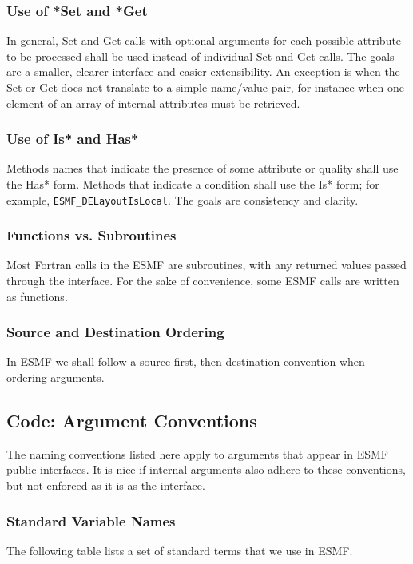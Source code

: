 \subsubsection{Use of *Set and *Get} In general, Set and Get calls with optional arguments
for each possible attribute to be processed shall be used instead of individual
Set and Get calls.  The goals are a smaller, clearer interface and easier extensibility.
An exception is when the Set or Get does not translate to a simple name/value pair,
for instance when one element of an array of internal attributes must be retrieved.

\subsubsection{Use of Is* and Has*} Methods names that indicate the 
presence of some attribute or quality shall use the Has* form.  Methods 
that indicate a condition shall use the Is* form; for example, 
{\tt ESMF\_DELayoutIsLocal}.  The goals are consistency and clarity.

\subsubsection{Functions vs. Subroutines}
Most Fortran calls in the ESMF are subroutines, with 
any returned values passed through the interface.  For the sake of 
convenience, some ESMF calls are written as functions.

\subsubsection{Source and Destination Ordering}
In ESMF we shall follow a source first, then destination convention when ordering
arguments.

\subsection{Code: Argument Conventions}

The naming conventions listed here apply to arguments that appear in 
ESMF public interfaces.  It is nice if internal arguments also adhere
to these conventions, but not enforced as it is as the interface.

\subsubsection{Standard Variable Names}

The following table lists a set of standard terms that we use in ESMF.


